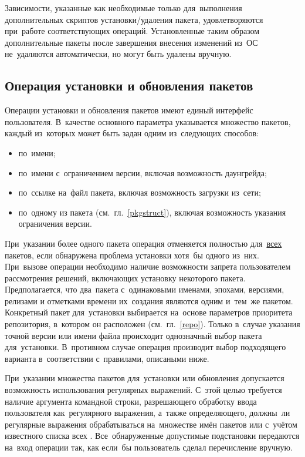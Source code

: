 Зависимости, указанные как необходимые только для~выполнения дополнительных скриптов установки/удаления пакета,
удовлетворяются при~работе соответствующих операций.
Установленные таким образом дополнительные пакеты после завершения внесения изменений из~ОС не~удаляются автоматически,
но могут быть удалены вручную.

\subsection{Операция установки и обновления пакетов}

Операции установки и обновления пакетов имеют единый интерфейс пользователя.
В~качестве основного параметра указывается множество пакетов, каждый из~которых может быть  задан одним из~следующих способов:

\begin{itemize}
\item {по~имени;}
\item {по~имени с~ограничением версии, включая возможность даунгрейда;}
\item {по~ссылке на~файл пакета, включая возможность загрузки из~сети;}
\item{по~одному из  пакета (см.~гл.~\ref{pkgstruct}), включая возможность указания ограничения версии.}
\end{itemize}

При~указании более одного пакета операция отменяется полностью для~\underline{всех} пакетов, 
если обнаружена проблема установки хотя~бы одного из~них.
При~вызове операции необходимо наличие возможности запрета пользователем рассмотрения решений, 
включающих установку некоторого пакета. 
Предполагается, что два~пакета с~одинаковыми именами, эпохами, версиями, релизами и отметками времени их~создания являются одним и~тем~же пакетом.
Конкретный пакет для~установки выбирается на~основе параметров приоритета репозитория, в~котором  он расположен (см.~гл.~\ref{repo}).
Только в~случае указания точной версии или имени файла происходит однозначный выбор пакета для~установки.
В~противном случае операция производит выбор подходящего варианта в~соответствии с~правилами, описаными ниже.

При~указании множества пакетов для~установки или обновления  допускается возможность использования регулярных выражений.
С~этой целью требуется наличие аргумента командной строки,  
разрешающего обработку ввода пользователя как~регулярного выражения,
а~также определяющего,  должны~ли регулярные выражения обрабатываться на~множестве имён пакетов или с~учётом известного списка всех .
Все~обнаруженные допустимые подстановки передаются на~вход операции так, как если~бы пользователь сделал перечисление вручную.

